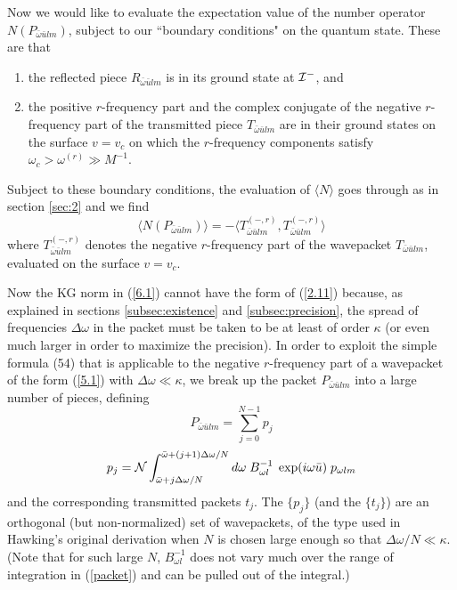 \documentclass[12pt]{article}
\def\o{\omega}
\def\obar{\bar{\omega}}
\def\ubar{\bar{u}}
\def\la{\langle}
\def\ra{\rangle}
\def\pastI{{\cal I}^-}
\begin{document}
Now we would like to evaluate the expectation value of the
number operator $N(P_{\obar\ubar lm})$, subject to our
``boundary conditions" on the quantum state. These are
that
\begin{enumerate}
\item the reflected piece $R_{\obar\ubar lm}$ is
in its ground state at $\pastI$, and
\item the positive $r$-frequency part and the
complex conjugate of the negative $r$-frequency part of the
transmitted piece $T_{\obar\ubar lm}$ are in their ground
states on the surface $v=v_c$ on which the $r$-frequency
components satisfy $\o_c>\o^{(r)}\gg M^{-1}$.
\end{enumerate}
Subject to these boundary conditions, the evaluation of
$\la N\ra$ goes through as in section \ref{sec:2} and we find
\begin{equation}
\la N(P_{\obar\ubar lm})\ra=
-\la T^{\scriptscriptstyle(-,r)}_{\obar\ubar lm},
T^{\scriptscriptstyle(-,r)}_{\obar\ubar lm}\ra
\label{6.1}
\end{equation}
where $T^{\scriptscriptstyle(-,r)}_{\obar\ubar lm}$
denotes the negative $r$-frequency part of the wavepacket
$T_{\obar\ubar lm}$, evaluated on the surface $v=v_c$.

Now the KG norm in (\ref{6.1}) cannot have the form of
(\ref{2.11}) because, as explained in sections
\ref{subsec:existence} and \ref{subsec:precision},
the spread of frequencies $\Delta\o$ in the packet
must be taken to be at least of order $\kappa$
(or even much larger in order to maximize the precision).
In order to exploit the simple formula (54)
that is applicable to
the negative $r$-frequency part of a wavepacket of the
form (\ref{5.1}) with $\Delta\o\ll\kappa$, we break up the packet
$P_{\obar\ubar lm}$ into a large number of pieces, defining
\begin{equation} P_{\obar\ubar lm}=\sum_{j=0}^{N-1} p_j
\label{6.2}
\end{equation}
\begin{equation} p_j={\cal N}
\int_{\obar+j\Delta\o/N}^{\obar+(j+1)\Delta\o/N}
d\o\; B_{\o l}^{-1}\;
\exp(i\o\ubar)\; p_{\o lm}
\label{packet}
\end{equation}
and the corresponding transmitted packets $t_j$.
The $\{p_j\}$ (and the $\{t_j\}$) are an orthogonal (but
non-normalized) set of
wavepackets, of the type used in Hawking's original
derivation when $N$ is chosen large enough so that
$\Delta\o/N\ll\kappa$.
(Note that for such large $N$, $B_{\o l}^{-1}$ does not
vary much over the range of integration in
(\ref{packet}) and can be pulled out of the integral.)
\end{document}
